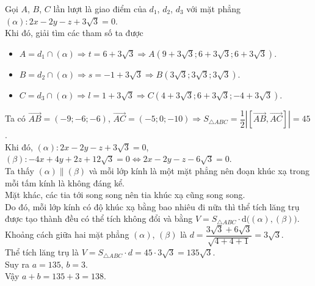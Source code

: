 \begin{bt}
{		Gọi $A$, $B$,  $C$ lần lượt là giao điểm của $d_1$, $d_2$, $d_3$ với mặt phẳng $(\alpha)\colon 2x-2y-z+3\sqrt 3=0$.\\
		 Khi đó, giải tìm các tham số ta được
		\begin{itemize}
			\item $A=d_1\cap(\alpha) \Rightarrow t=6+3\sqrt 3\Rightarrow A\left(9+3\sqrt 3;6+3\sqrt 3;6+3\sqrt 3\right)$. 
			\item $B=d_2\cap(\alpha) \Rightarrow  s=-1+3\sqrt 3\Rightarrow B(3\sqrt 3;3\sqrt 3;3\sqrt 3)$.
			\item $C=d_3\cap(\alpha) \Rightarrow l=1+3\sqrt 3\Rightarrow C(4+3\sqrt  3;6+3\sqrt 3;-4+3\sqrt 3)$.
		\end{itemize}
		Ta  có $\overrightarrow{AB}=(-9;-6;-6)$, $\overrightarrow{AC}=(-5;0;-10) \Rightarrow S_{\triangle ABC}=\dfrac{1}{2}\left|\left[\overrightarrow{AB},\overrightarrow{AC}\right]\right|=45$.\\
		Khi đó, $(\alpha)\colon  2x-2y-z+3\sqrt 3=0$, $(\beta)\colon -4x+4y+2z+12\sqrt 3=0 \Leftrightarrow 2x-2y-z-6\sqrt 3=0$.\\
		Ta thấy $(\alpha)\parallel (\beta)$ và mỗi lớp kính là một mặt phẳng nên đoạn khúc xạ trong  mỗi tấm kính là không đáng kể.\\
		Mặt khác, các tia tới song song nên  tia khúc xạ cũng song song.\\
		 Do đó, mỗi lớp kính có độ khúc xạ bằng bao nhiêu đi nữa thì thể tích lăng trụ được tạo thành đều có thể tích không đổi và bằng
		$V=S_{\triangle ABC}\cdot  \mathrm{d}\Big((\alpha),(\beta)\Big)$.\\
		Khoảng cách giữa hai mặt phẳng $(\alpha)$, $(\beta)$ là $d=\dfrac{3\sqrt 3+6\sqrt  3}{\sqrt{4+4+1}}=3\sqrt 3$.\\
		Thể tích lăng trụ là $V=S_{\triangle ABC}\cdot d=45\cdot 3\sqrt  3=135\sqrt 3$.\\
		Suy  ra $a=135$, $b=3$.\\
		Vậy $a+b=135+3=138$. 
	 }
\end{bt}

